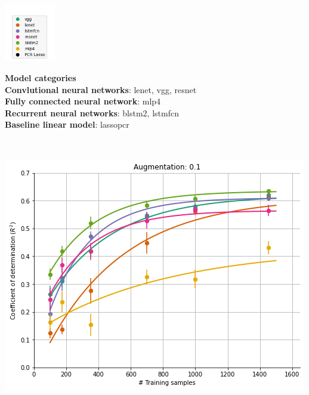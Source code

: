 \documentclass[a0paper,landscape,fontscale=0.365]{baposter}
\newenvironment{Figure}
  {\par\medskip\noindent\minipage{\linewidth}}
  {\endminipage\par\medskip}
\begin{document}
\begin{poster}
{\begin{multicols}{4}
    \begin{minipage}[c]{0.3\linewidth}
    \begin{Figure}
    \includegraphics[height=2.5cm]{figures/legend}
    \end{Figure}
    \end{minipage}
    \begin{minipage}[c]{0.6\linewidth}
    \begin{framed}
        \small
        \textbf{Model categories} \\
        \textbf{Convlutional neural networks}: lenet, vgg, resnet \\
        \textbf{Fully connected neural network}: mlp4 \\
        \textbf{Recurrent neural networks}: blstm2, lstmfcn \\
        \textbf{Baseline linear model}: lassopcr
    \end{framed}
    \end{minipage}
\end{multicols}
\\
\begin{multicols}{4}
    \begin{Figure}
        \centering
        \includegraphics[width=1.0\linewidth]{figures/curves_aug_10}
    \end{Figure}


\end{multicols}}
\end{poster}
\end{document}
